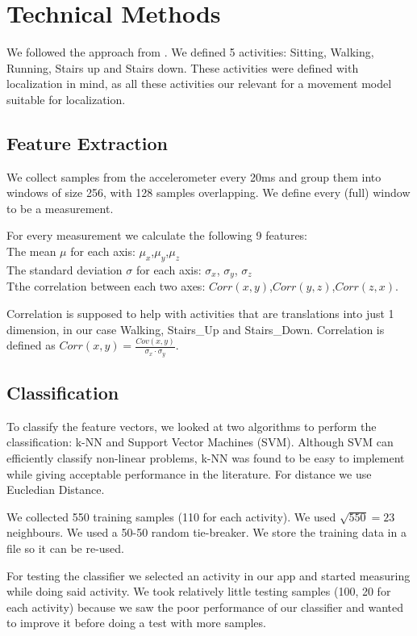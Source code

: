 \section{Technical Methods}
\label{sec:technical-methods}

We followed the approach from \cite{ravi2005activity}. We defined 5 activities: Sitting, Walking, Running, Stairs up and Stairs down. These activities were defined with localization in mind, as all these activities our relevant for a movement model suitable for localization.

\subsection{Feature Extraction}
\label{sec:feature-extraction}
We collect samples from the accelerometer every 20ms and group them into windows of size 256, with 128 samples overlapping. We define every (full) window to be a measurement.

For every measurement we calculate the following 9 features: \\
The mean $\mu$ for each axis: $\mu_x$,$\mu_y$,$\mu_z$ \\
The standard deviation $\sigma$ for each axis: $\sigma_x$, $\sigma_y$, $\sigma_z$ \\
Tthe correlation between each two axes:  $Corr(x,y)$,$Corr(y,z)$,$Corr(z,x)$.


Correlation is supposed to help with activities that are translations into just 1 dimension, in our case Walking, Stairs\_Up and Stairs\_Down.
Correlation is defined as $
	Corr(x,y) = \frac{Cov(x,y)}{\sigma_x \cdot \sigma_y}$.

\subsection{Classification}
\label{sec:classification}
To classify the feature vectors, we looked at two algorithms to perform the classification: k-NN and Support Vector Machines (SVM). Although SVM can efficiently classify non-linear problems, k-NN was found to be easy to implement while giving acceptable performance in the literature. For distance we use Eucledian Distance.

We collected 550 training samples (110 for each activity). We used $\sqrt{550}=23$ neighbours. We used a 50-50 random tie-breaker. We store the training data in a file so it can be re-used.

For testing the classifier we selected an activity in our app and started measuring while doing said activity. We took relatively little testing samples (100, 20 for each activity) because we saw the poor performance of our classifier and wanted to improve it before doing a test with more samples.

